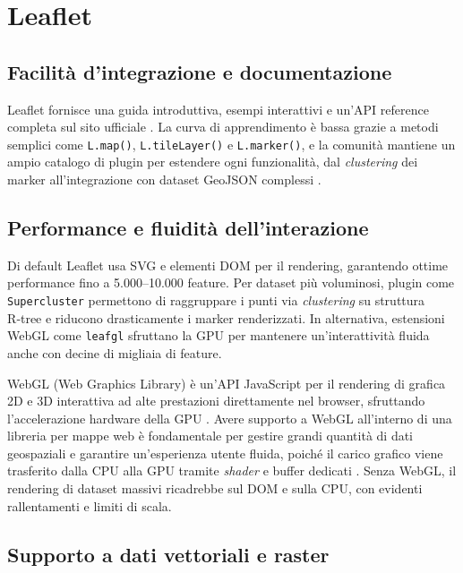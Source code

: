 \section{Leaflet}
\label{ch:leaflet}

\subsection{Facilità d'integrazione e documentazione}  
Leaflet fornisce una guida introduttiva, esempi interattivi e un'API reference completa sul sito ufficiale \cite{leaflet-doc}.  
La curva di apprendimento è bassa grazie a metodi semplici come \texttt{L.map()}, \texttt{L.tileLayer()} e \texttt{L.marker()}, e la comunità mantiene un ampio catalogo di plugin per estendere ogni funzionalità, dal \textit{clustering} dei marker all'integrazione con dataset GeoJSON complessi \cite{react-leaflet}.

\subsection{Performance e fluidità dell'interazione}  
Di default Leaflet usa SVG e elementi DOM per il rendering, garantendo ottime performance fino a 5.000–10.000 feature\cite{supercluster}.  
Per dataset più voluminosi, plugin come \texttt{Supercluster} permettono di raggruppare i punti via \textit{clustering} su struttura R‑tree e riducono drasticamente i marker renderizzati\cite{supercluster}.  
In alternativa, estensioni WebGL come \texttt{leafgl} sfruttano la GPU per mantenere un'interattività fluida anche con decine di migliaia di feature\cite{leafgl}.  

WebGL (Web Graphics Library) è un'API JavaScript per il rendering di grafica 2D e 3D interattiva ad alte prestazioni direttamente nel browser, sfruttando l'accelerazione hardware della GPU \cite{wiki-webgl}.  
Avere supporto a WebGL all'interno di una libreria per mappe web è fondamentale per gestire grandi quantità di dati geospaziali e garantire un'esperienza utente fluida, poiché il carico grafico viene trasferito dalla CPU alla GPU tramite \textit{shader} e buffer dedicati \cite{khronos-webgl}.  
Senza WebGL, il rendering di dataset massivi ricadrebbe sul DOM e sulla CPU, con evidenti rallentamenti e limiti di scala.


\subsection{Supporto a dati vettoriali e raster}  

